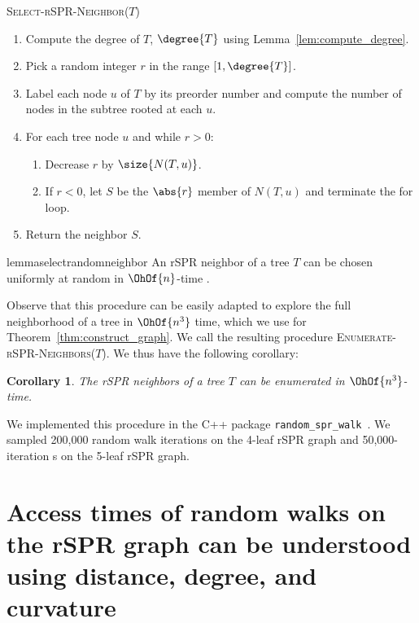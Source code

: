 \documentclass[11pt,onecolumn,conference]{IEEEtran}
\newtheorem{corollary}[theorem]{Corollary}
\newcommand{\cuttable}[2][]{%
    \ifthenelse{\equal{#1}{}}%
		{}%
		{#1}%
}
\begin{document}
\vspace{1em}
\textsc{Select-rSPR-Neighbor($T$)}
\begin{enumerate}[label={\arabic*}.]
	\item	Compute the degree of $T$, $\degree{T}$ using Lemma~\ref{lem:compute_degree}.
	\item Pick a random integer $r$ in the range $[1,\degree{T}]$.
	\item Label each node $u$ of $T$ by its preorder number and compute the number of nodes in the subtree rooted at each $u$.
\item For each tree node $u$ and while $r > 0$:
	\begin{enumerate}
		\item Decrease $r$ by $\size{N(T,u)}$.
		\item If $r < 0$, let $S$ be the $\abs{r}$ member of $N(T,u)$ and terminate the for loop.
	\end{enumerate}
\item Return the neighbor $S$.
\end{enumerate}

\begin{restatable}{lemma}{selectrandomneighbor}
	\label{lem:select_random_neighbor}
	An rSPR neighbor of a tree $T$ can be chosen uniformly at random in $\OhOf{n}$-time\cuttable{ using $\OhOf{n}$ space}.
\end{restatable}

Observe that this procedure can be easily adapted to explore the full neighborhood of a tree in $\OhOf{n^3}$ time, which we use for Theorem~\ref{thm:construct_graph}. We call the resulting procedure \textsc{Enumerate-rSPR-Neighbors($T$)}.
We thus have the following corollary:

\begin{corollary}
\label{cor:enumerate_neighbors}
	The rSPR neighbors of a tree $T$ can be enumerated in $\OhOf{n^3}$-time.
\end{corollary}

We implemented this procedure in the C++ package \texttt{random\_spr\_walk}~\cite{random_spr_walk}.
We sampled \cuttable{a }200,000\cuttable{-iteration} random walk\cuttable[ iterations]{} on the 4-leaf rSPR graph and \cuttable{a }50,000-iteration\cuttable[s]{ random walk} on the 5-leaf rSPR graph.

\section{Access times of random walks on the rSPR graph can be understood using distance, degree, and curvature}
\end{document}

